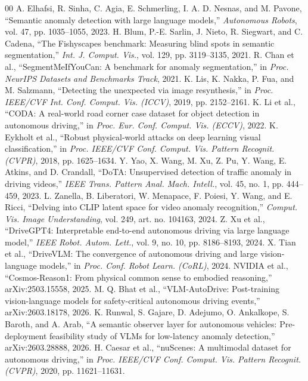 \documentclass[conference]{IEEEtran}
\begin{document}
\begin{thebibliography}{00}
 A. Elhafsi, R. Sinha, C. Agia, E. Schmerling, I. A. D. Nesnas, and M. Pavone, ``Semantic anomaly detection with large language models,'' \emph{Autonomous Robots}, vol. 47, pp. 1035--1055, 2023.
 H. Blum, P.-E. Sarlin, J. Nieto, R. Siegwart, and C. Cadena, ``The Fishyscapes benchmark: Measuring blind spots in semantic segmentation,'' \emph{Int. J. Comput. Vis.}, vol. 129, pp. 3119--3135, 2021.
 R. Chan et al., ``SegmentMeIfYouCan: A benchmark for anomaly segmentation,'' in \emph{Proc. NeurIPS Datasets and Benchmarks Track}, 2021.
 K. Lis, K. Nakka, P. Fua, and M. Salzmann, ``Detecting the unexpected via image resynthesis,'' in \emph{Proc. IEEE/CVF Int. Conf. Comput. Vis. (ICCV)}, 2019, pp. 2152--2161.
 K. Li et al., ``CODA: A real-world road corner case dataset for object detection in autonomous driving,'' in \emph{Proc. Eur. Conf. Comput. Vis. (ECCV)}, 2022.
 K. Eykholt et al., ``Robust physical-world attacks on deep learning visual classification,'' in \emph{Proc. IEEE/CVF Conf. Comput. Vis. Pattern Recognit. (CVPR)}, 2018, pp. 1625--1634.
 Y. Yao, X. Wang, M. Xu, Z. Pu, Y. Wang, E. Atkins, and D. Crandall, ``DoTA: Unsupervised detection of traffic anomaly in driving videos,'' \emph{IEEE Trans. Pattern Anal. Mach. Intell.}, vol. 45, no. 1, pp. 444--459, 2023.
 L. Zanella, B. Liberatori, W. Menapace, F. Poiesi, Y. Wang, and E. Ricci, ``Delving into CLIP latent space for video anomaly recognition,'' \emph{Comput. Vis. Image Understanding}, vol. 249, art. no. 104163, 2024.
 Z. Xu et al., ``DriveGPT4: Interpretable end-to-end autonomous driving via large language model,'' \emph{IEEE Robot. Autom. Lett.}, vol. 9, no. 10, pp. 8186--8193, 2024.
 X. Tian et al., ``DriveVLM: The convergence of autonomous driving and large vision-language models,'' in \emph{Proc. Conf. Robot Learn. (CoRL)}, 2024.
 NVIDIA et al., ``Cosmos-Reason1: From physical common sense to embodied reasoning,'' arXiv:2503.15558, 2025.
 M. Q. Bhat et al., ``VLM-AutoDrive: Post-training vision-language models for safety-critical autonomous driving events,'' arXiv:2603.18178, 2026.
 K. Runwal, S. Gajare, D. Adejumo, O. Ankalkope, S. Baroth, and A. Arab, ``A semantic observer layer for autonomous vehicles: Pre-deployment feasibility study of VLMs for low-latency anomaly detection,'' arXiv:2603.28888, 2026.
 H. Caesar et al., ``nuScenes: A multimodal dataset for autonomous driving,'' in \emph{Proc. IEEE/CVF Conf. Comput. Vis. Pattern Recognit. (CVPR)}, 2020, pp. 11621--11631.

\end{thebibliography}
\end{document}
